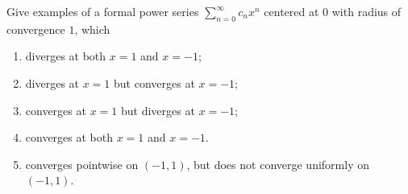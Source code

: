 \begin{exercise}\label{ex 4.1.2}
    Give examples of a formal power series \(\sum_{n = 0}^\infty c_n x^n\) centered at \(0\) with radius of convergence \(1\), which
    \begin{enumerate}
        \item diverges at both \(x = 1\) and \(x = -1\);
        \item diverges at \(x = 1\) but converges at \(x = -1\);
        \item converges at \(x = 1\) but diverges at \(x = -1\);
        \item converges at both \(x = 1\) and \(x = -1\).
        \item converges pointwise on \((-1, 1)\), but does not converge uniformly on \((-1, 1)\).
    \end{enumerate}
\end{exercise}